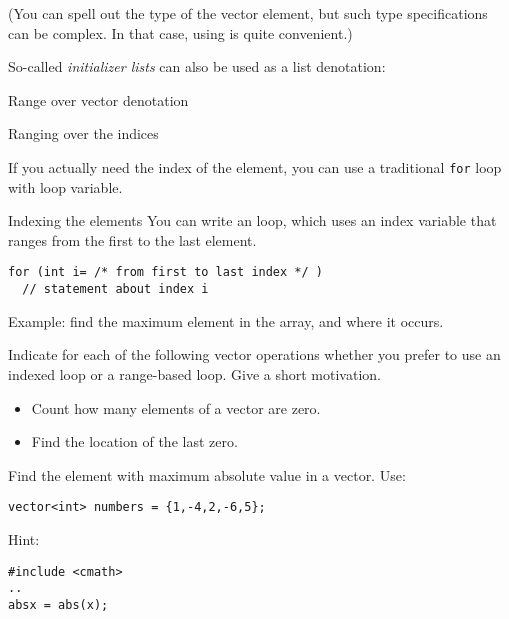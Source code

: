 (You can spell out the type of the vector element, but such type
specifications can be complex. In that case, using  is
quite convenient.)

So-called \emph{initializer lists}
can also be used as a list denotation:

\begin{block}{Range over vector denotation}
  \label{sl:range-denote}
\end{block}

 {Ranging over the indices}

If you actually need the index of the element, you can use a
traditional \lstinline{for} loop with loop variable.

\begin{block}{Indexing the elements}
  \label{sl:index-range}
  You can write an  loop, which uses an
  index variable that ranges from the first to the last element.
\begin{lstlisting}
for (int i= /* from first to last index */ )
  // statement about index i
\end{lstlisting}
Example: find the maximum element in the array, and where it occurs.
%
\end{block}

\begin{exercise}
  \label{ex:range-for}
  Indicate for each of the following vector operations whether you
  prefer to use an indexed loop or a range-based loop. Give a short
  motivation.
  \begin{itemize}
  \item Count how many elements of a vector are zero.
  \item Find the location of the last zero.
  \end{itemize}
\end{exercise}

\begin{exercise}
  \label{ex:array-max}
  Find the element with maximum absolute value in a vector. Use:
\begin{lstlisting}
vector<int> numbers = {1,-4,2,-6,5};
\end{lstlisting}

Hint:
\begin{lstlisting}
#include <cmath>
..
absx = abs(x);
\end{lstlisting}
\end{exercise}

